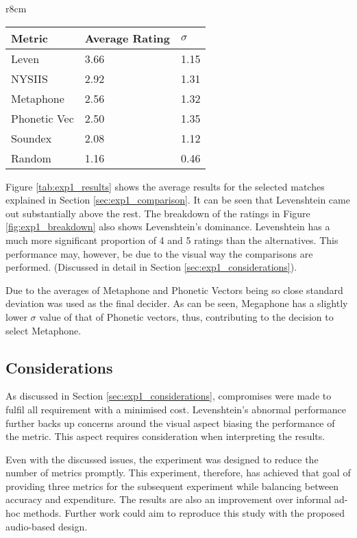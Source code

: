\begin{wraptable}[11]{r}{8cm}
    \centering
    \begin{tabular}{|l|l|l|}
        \hline
        \textbf{Metric} & \textbf{Average Rating}  & \textbf{$\sigma$}\\
        \hline
        Leven     & 3.66  & 1.15\\
        NYSIIS    & 2.92 & 1.31\\
        Metaphone & 2.56 & 1.32\\
        Phonetic Vec & 2.50 & 1.35\\
        Soundex & 2.08 & 1.12 \\
        \hline
        Random  & 1.16 & 0.46\\
        \hline
    \end{tabular}
    \caption{Average metric performance}
    \label{tab:exp1_results}
\end{wraptable}


Figure \ref{tab:exp1_results} shows the average results for the selected matches explained in Section \ref{sec:exp1_comparison}. It can be seen that Levenshtein came out substantially above the rest. The breakdown of the ratings in Figure \ref{fig:exp1_breakdown} also shows Levenshtein's dominance. Levenshtein has a much more significant proportion of 4 and 5 ratings than the alternatives. This performance may, however, be due to the visual way the comparisons are performed. (Discussed in detail in Section \ref{sec:exp1_considerations}). 

Due to the averages of Metaphone and Phonetic Vectors being so close standard deviation was used as the final decider. As can be seen, Megaphone has a slightly lower $\sigma$ value of that of Phonetic vectors, thus, contributing to the decision to select Metaphone.

\subsection*{Considerations}
As discussed in Section \ref{sec:exp1_considerations}, compromises were made to fulfil all requirement with a minimised cost. Levenshtein's abnormal performance further backs up concerns around the visual aspect biasing the performance of the metric. This aspect requires consideration when interpreting the results. 

Even with the discussed issues, the experiment was designed to reduce the number of metrics promptly. This experiment, therefore, has achieved that goal of providing three metrics for the subsequent experiment while balancing between accuracy and expenditure. The results are also an improvement over informal ad-hoc methods. Further work could aim to reproduce this study with the proposed audio-based design.

